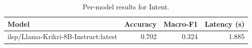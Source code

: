 \begin{table}[t]
\centering
\caption{Per-model results for Intent.}
\label{tab:appendix-intent-classification-analysis}
\begin{tabular}{lrrr}
\toprule
Model & Accuracy & Macro-F1 & Latency (s) \\
\midrule
ilsp/Llama-Krikri-8B-Instruct:latest & 0.702 & 0.324 & 1.885 \\
\bottomrule
\end{tabular}
\end{table}
